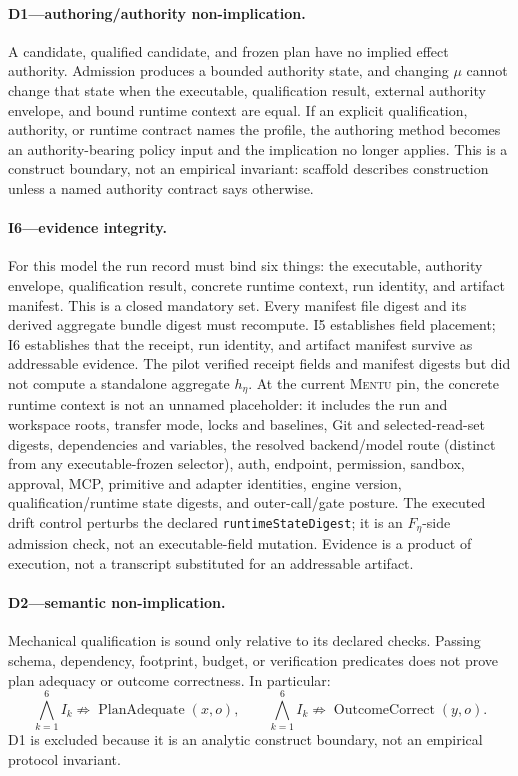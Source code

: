 \documentclass[11pt]{article}
\newcommand{\mentu}{\textsc{Mentu}}
\newcommand{\code}[1]{\texttt{#1}}
\begin{document}
\paragraph{D1---authoring/authority non-implication.}
A candidate, qualified candidate, and frozen plan have no implied effect
authority.  Admission produces a bounded authority state, and changing
\(\mu\) cannot change that state when the executable, qualification result,
external authority envelope, and bound runtime context are equal.  If an
explicit qualification, authority, or runtime contract names the profile,
the authoring method becomes an authority-bearing policy input and the
implication no longer applies. This is a construct boundary, not an empirical
invariant: scaffold describes construction unless a named authority contract
says otherwise.

\paragraph{I6---evidence integrity.}
For this model the run record must bind six things: the executable, authority
envelope, qualification result, concrete runtime context, run identity, and
artifact manifest.  This is a closed mandatory set.  Every manifest file
digest and its derived aggregate bundle digest must recompute. I5 establishes
field placement; I6 establishes that the receipt, run identity, and artifact
manifest survive as addressable evidence. The pilot
verified receipt fields and manifest digests but did not compute a standalone
aggregate \(h_\eta\).
At the current \mentu{} pin, the concrete runtime context is not an unnamed
placeholder: it includes the run and workspace roots, transfer mode, locks and
baselines, Git and selected-read-set digests, dependencies and variables,
the resolved backend/model route (distinct from any executable-frozen
selector), auth, endpoint, permission, sandbox, approval, MCP, primitive and
adapter identities, engine version, qualification/runtime state digests, and
outer-call/gate posture. The executed drift control perturbs the declared
\code{runtimeStateDigest}; it is an \(F_\eta\)-side admission check, not an
executable-field mutation.
Evidence is a product of execution, not a transcript substituted for an
addressable artifact.

\paragraph{D2---semantic non-implication.}
Mechanical qualification is sound only relative to its declared checks.
Passing schema, dependency, footprint, budget, or verification predicates does
not prove plan adequacy or outcome correctness. In particular:
\[
\bigwedge_{k=1}^{6}I_k
\not\Rightarrow \operatorname{PlanAdequate}(x,o),
\qquad
\bigwedge_{k=1}^{6}I_k
\not\Rightarrow \operatorname{OutcomeCorrect}(y,o).
\]
D1 is excluded because it is an analytic construct boundary, not an empirical
protocol invariant.
\end{document}
